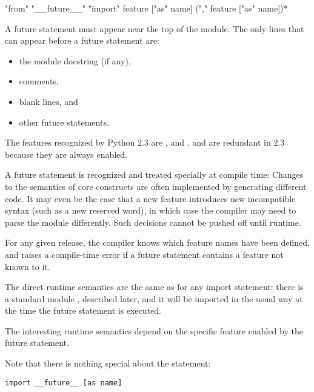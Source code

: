 \begin{productionlist}[*]
             {"from" "__future__" "import" feature ["as" name] ("," feature ["as" name])*}
\end{productionlist}

A future statement must appear near the top of the module.  The only
lines that can appear before a future statement are:

\begin{itemize}

\item the module docstring (if any),
\item comments,
\item blank lines, and
\item other future statements.

\end{itemize}

The features recognized by Python 2.3 are ,
 and .   and
 are redundant in 2.3 because they are always
enabled. 

A future statement is recognized and treated specially at compile
time: Changes to the semantics of core constructs are often
implemented by generating different code.  It may even be the case
that a new feature introduces new incompatible syntax (such as a new
reserved word), in which case the compiler may need to parse the
module differently.  Such decisions cannot be pushed off until
runtime.

For any given release, the compiler knows which feature names have been
defined, and raises a compile-time error if a future statement contains
a feature not known to it.

The direct runtime semantics are the same as for any import statement:
there is a standard module , described later, and
it will be imported in the usual way at the time the future statement
is executed.

The interesting runtime semantics depend on the specific feature
enabled by the future statement.

Note that there is nothing special about the statement:

\begin{verbatim}
import __future__ [as name]
\end{verbatim}


